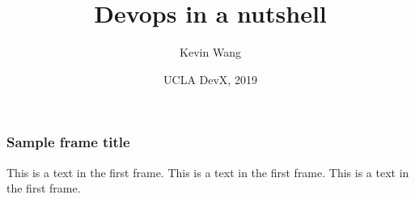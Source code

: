 \documentclass{beamer}
\title[Devops Series]{Devops in a nutshell}
\author{Kevin Wang}
\date[DevX 2019]{UCLA DevX, 2019}
\begin{document}
\frame{\titlepage}

\begin{frame}
  \frametitle{Sample frame title}
  This is a text in the first frame. This is a text in the first frame. This is a text in the first frame.
\end{frame}
\end{document}
